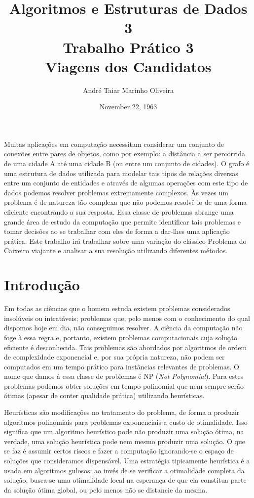 \documentclass[12pt]{article}
\title{Algoritmos e Estruturas de Dados 3 \\ Trabalho Prático 3 \\
\huge{Viagens dos Candidatos}}
\date{November 22, 1963}
\author{André Taiar Marinho Oliveira}
\begin{document}
\maketitle

\begin{resumo}
Muitas aplicações em computação necessitam considerar um conjunto de conexões entre pares 
de objetos, como por exemplo: a distância a ser percorrida de uma cidade A até uma cidade B
(ou entre um conjunto de cidades). O grafo é uma estrutura de dados utilizada para modelar 
tais tipos de relações diversas entre um conjunto de entidades e através de algumas operações 
com este tipo de dados podemos resolver problemas extremamente complexos. Às vezes um problema 
é de natureza tão complexa que não podemos resolvê-lo de uma forma eficiente encontrando a sua 
resposta. Essa classe de problemas abrange uma grande área de estudo da computação que permite 
identificar tais problemas e tomar decisões ao se trabalhar com eles de forma a dar-lhes uma 
aplicação prática. Este trabalho irá trabalhar sobre uma variação do clássico Problema do 
Caixeiro viajante e analisar a sua resolução utilizando diferentes métodos.
\end{resumo}

\section{Introdução}

Em todas as ciências que o homem estuda existem problemas considerados insolúveis 
ou intratáveis; problemas que, pelo menos com o conhecimento do qual dispomos hoje 
em dia, não conseguimos resolver. A ciência da computação não foge à essa regra e, 
portanto, existem problemas computacionais cuja solução eficiente é desconhecida.
Tais problemas são abordados por algoritmos de ordem de complexidade exponencial e,
por sua própria natureza, não podem ser computados em um tempo prático para instâncias
relevantes de problemas. O nome que damos à essa classe de problemas é NP (\textit{Not 
Polynomial}). Para estes problemas podemos obter soluções em tempo polinomial que nem
sempre serão ótimas (apesar de conter qualidade prática) utilizando heurísticas. 

Heurísticas são modificações no tratamento do problema, de forma a produzir algoritmos 
polinomiais para problemas exponenciais a custo de otimalidade. Isso significa que um 
algoritmo heurístico pode não produzir uma solução ótima, na verdade, uma solução 
heurística pode nem mesmo produzir uma solução. O que se faz é assumir certos riscos 
e fazer a computação ignorando-se o espaço de soluções que consideramos dispensável. 
Uma estratégia tipicamente heurística é a usada em algoritmos gulosos: ao invés de se 
verificar a otimalidade completa da solução, busca-se uma otimalidade local na esperança 
de que ela constitua parte da solução ótima global, ou pelo menos não se distancie da 
mesma.
\end{document}
